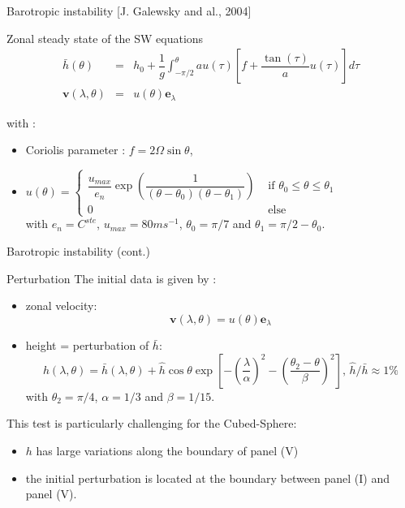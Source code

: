 \documentclass[11pt]{beamer}
\def\gint{\displaystyle\int}
\begin{document}
\begin{frame}{Barotropic instability [J. Galewsky and al., 2004]}

\begin{block}{Zonal steady state of the SW equations}
\begin{equation}
\begin{array}{rcl}
\bar{h}(\theta) & = & h_0 + \dfrac{1}{g}\gint^{\theta}_{-\pi/2} a u(\tau) \left[ f + \dfrac{\tan(\tau)}{a} u(\tau) \right] d \tau \\
\mathbf{v}(\lambda,\theta) & = & u(\theta) \mathbf{e}_{\lambda}
\end{array}
\end{equation}
\end{block}

with :

\begin{itemize}
\item Coriolis parameter : $f = 2 \Omega \sin \theta$,
\item $u(\theta)=\left\lbrace
\begin{array}{ll}
\dfrac{u_{max}}{e_n} \exp\left( \dfrac{1}{(\theta-\theta_0)(\theta-\theta_1)} \right) & \text{ if } \theta_0 \leq \theta \leq \theta_1 \\
0 & \text{ else}
\end{array}\right.$\\
 with $e_n=C^{ste}$, $u_{max} = 80 ms^{-1}$, $\theta_0 = \pi/7$ and $\theta_1 = \pi/2 - \theta_0$.
\end{itemize}
\end{frame}



\begin{frame}{Barotropic instability (cont.)}
\begin{block}{Perturbation}
The initial data is given by :
\begin{itemize}
\item zonal velocity:
$$\mathbf{v}(\lambda,\theta) = u(\theta) \mathbf{e}_{\lambda}$$
\item height = perturbation of $\bar{h}$:
$$h(\lambda,\theta) = \bar{h}(\lambda,\theta) + \hat{h} \cos \theta \exp \left[ - \left( \dfrac{\lambda}{\alpha} \right)^2 - \left( \dfrac{\theta_2 - \theta}{\beta} \right)^2 \right] \text{, } \hat{h}/\bar{h} \approx 1 \%$$
with $\theta_2 = \pi/4$, $\alpha = 1/3$ and $\beta = 1/15$.
\end{itemize}
\end{block}

\begin{block}{}
This test is particularly challenging for the Cubed-Sphere:

\begin{itemize}
\item $h$ has large variations along the boundary of panel (V)
\item the initial perturbation is located at the boundary between panel (I) and panel (V).
\end{itemize}
\end{block}
\end{frame}
\end{document}

